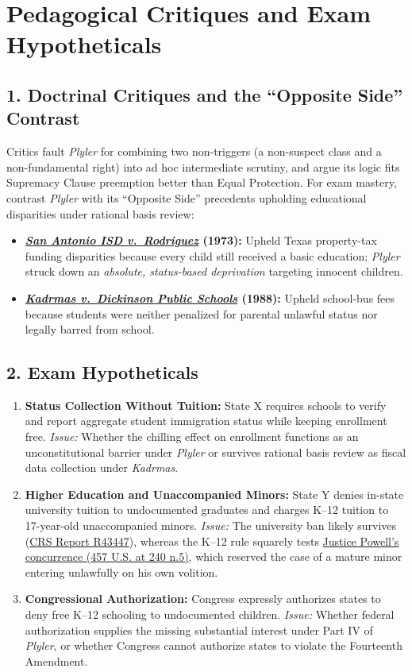 \documentclass[12pt]{article}
\begin{document}
\section{Pedagogical Critiques and Exam Hypotheticals}

\subsection*{1. Doctrinal Critiques and the ``Opposite Side'' Contrast}
Critics fault \textit{Plyler} for combining two non-triggers (a non-suspect class and a non-fundamental right) into ad hoc intermediate scrutiny, and argue its logic fits Supremacy Clause preemption better than Equal Protection. For exam mastery, contrast \textit{Plyler} with its ``Opposite Side'' precedents upholding educational disparities under rational basis review:
\begin{itemize}
    \item \textbf{\href{https://supreme.justia.com/cases/federal/us/411/1/}{\textit{San Antonio ISD v.\ Rodriguez}} (1973):} Upheld Texas property-tax funding disparities because every child still received a basic education; \textit{Plyler} struck down an \textit{absolute, status-based deprivation} targeting innocent children.
    \item \textbf{\href{https://supreme.justia.com/cases/federal/us/487/450/}{\textit{Kadrmas v.\ Dickinson Public Schools}} (1988):} Upheld school-bus fees because students were neither penalized for parental unlawful status nor legally barred from school.
\end{itemize}

\subsection*{2. Exam Hypotheticals}
\begin{enumerate}
    \item \textbf{Status Collection Without Tuition:} State X requires schools to verify and report aggregate student immigration status while keeping enrollment free. \textit{Issue:} Whether the chilling effect on enrollment functions as an unconstitutional barrier under \textit{Plyler} or survives rational basis review as fiscal data collection under \textit{Kadrmas}.
    \item \textbf{Higher Education and Unaccompanied Minors:} State Y denies in-state university tuition to undocumented graduates and charges K--12 tuition to 17-year-old unaccompanied minors. \textit{Issue:} The university ban likely survives (\href{https://www.everycrsreport.com/reports/R43447.html}{CRS Report R43447}), whereas the K--12 rule squarely tests \href{https://www.law.cornell.edu/supremecourt/text/457/202}{Justice Powell's concurrence (457 U.S. at 240 n.5)}, which reserved the case of a mature minor entering unlawfully on his own volition.
    \item \textbf{Congressional Authorization:} Congress expressly authorizes states to deny free K--12 schooling to undocumented children. \textit{Issue:} Whether federal authorization supplies the missing substantial interest under Part IV of \textit{Plyler}, or whether Congress cannot authorize states to violate the Fourteenth Amendment.
\end{enumerate}
\end{document}
